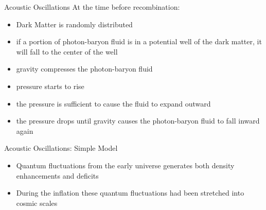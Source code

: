 \documentclass{beamer}
\begin{document}
\begin{frame}{Acoustic Oscillations}
At the time before recombination:
\begin{itemize}
    \item Dark Matter is randomly distributed
    \item if a portion of photon-baryon fluid is in a potential well of the dark matter, it will fall to the center of the well
    \item gravity compresses the photon-baryon fluid
    \item pressure starts to rise
    \item the pressure is sufficient to cause the fluid to expand outward
    \item the pressure drops until gravity causes the photon-baryon fluid to fall inward again
\end{itemize}
\begin{center}

\end{center}
\end{frame}



\begin{frame}{Acoustic Oscillations: Simple Model}


		
		
		
			\begin{itemize}
			    \item Quantum fluctuations from the early universe generates both density enhancements and deficits
			    \item During the inflation these quantum fluctuations had been stretched into cosmic scales
			\end{itemize}




\end{frame}
\end{document}
